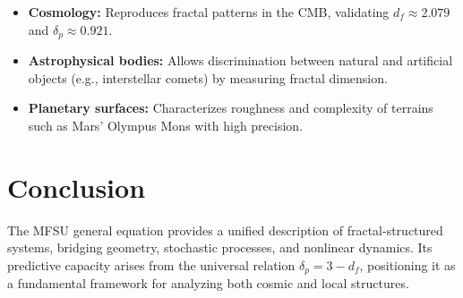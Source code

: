 \documentclass[11pt,a4paper]{article}
\begin{document}
\begin{itemize}
    \item \textbf{Cosmology:} Reproduces fractal patterns in the CMB, validating $d_f \approx 2.079$ and $\delta_p \approx 0.921$.  
    \item \textbf{Astrophysical bodies:} Allows discrimination between natural and artificial objects (e.g., interstellar comets) by measuring fractal dimension.  
    \item \textbf{Planetary surfaces:} Characterizes roughness and complexity of terrains such as Mars' Olympus Mons with high precision.  
\end{itemize}

\section*{Conclusion}

The MFSU general equation provides a unified description of fractal-structured systems, bridging geometry, stochastic processes, and nonlinear dynamics. Its predictive capacity arises from the universal relation $\delta_p = 3 - d_f$, positioning it as a fundamental framework for analyzing both cosmic and local structures.
\end{document}
